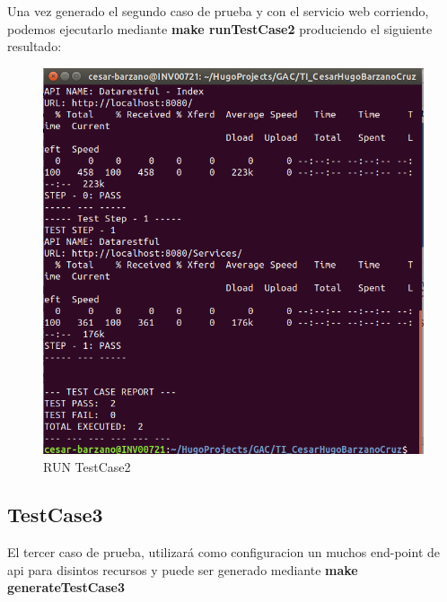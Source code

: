 \documentclass[a4paper,11pt]{book}
\begin{document}
Una vez generado el segundo caso de prueba y con el servicio web corriendo, podemos ejecutarlo mediante \textbf{make runTestCase2} produciendo el siguiente resultado:

\begin{figure}[H]  
\centering 
\includegraphics[scale=0.35]{imagenes/TestCase2_2.png}
\caption{ RUN TestCase2 }  
\end{figure} 


\subsection*{TestCase3}

El tercer caso de prueba, utilizará como configuracion un muchos end-point de api para disintos recursos y puede ser generado mediante \textbf{make generateTestCase3 }
\end{document}
